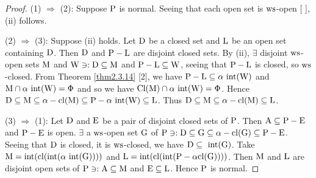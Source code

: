 \begin{proof}
(1) $\Rightarrow$ (2): Suppose $\mathrm{P}$ is normal. Seeing that each open set is $\mathrm{ws}$-open [ ], (ii) follows.

(2) $\Rightarrow$ (3): Suppose (ii) holds. Let $\mathrm{D}$ be a closed set and $\mathrm{L}$ be an open set containing $\mathrm{D}$. Then $\mathrm{D}$ and $\mathrm{P} -\mathrm{L}$ are disjoint closed sets. By (ii), $\exists$  disjoint $\mathrm{ws}$-open sets $\mathrm{M}$ and $\mathrm{W} \ni: \mathrm{D}\subseteq \mathrm{M}$ and $\mathrm{P}-\mathrm{L} \subseteq \mathrm{W}$, seeing that $\mathrm{P} -\mathrm{L}$ is closed, so $\mathrm{ws}$-closed. From Theorem \ref{thm2.3.14} [2], we have $\mathrm{P} -\mathrm{L} \subseteq \alpha\text{ int} (\mathrm{W})$ and $\mathrm{M} \cap \alpha\text{ int} (\mathrm{W}) = \Phi$ and so we have $\mathrm{Cl} (\mathrm{M}) \cap \alpha\text{ int} (\mathrm{W}) = \Phi$. Hence $\mathrm{D} \subseteq \mathrm{M} \subseteq \alpha-\mathrm{cl}(\mathrm{M}) \subseteq \mathrm{P} -\alpha\text{ int}(\mathrm{W}) \subseteq \mathrm{L}$. Thus $\mathrm{D}\subseteq\mathrm{M} \subseteq \alpha-\mathrm{cl} (\mathrm{M}) \subseteq \mathrm{L}$.

(3) $\Rightarrow$ (1): Let $\mathrm{D}$ and $\mathrm{E}$ be a pair of disjoint closed sets of $\mathrm{P}$. Then $\mathrm{A} \subseteq \mathrm{P}-\mathrm{E}$ and $\mathrm{P}-\mathrm{E}$ is open. $\exists$ a $\mathrm{ws}$-open set $\mathrm{G}$ of $\mathrm{P} \ni: \mathrm{D} \subseteq \mathrm{G} \subseteq \alpha-\mathrm{cl} (\mathrm{G}) \subseteq \mathrm{P}-\mathrm{E}$. Seeing that $\mathrm{D}$ is closed, it is $\mathrm{ws}$-closed, we have $\mathrm{D} \subseteq \text{ int} (\mathrm{G})$. Take $\mathrm{M} =\text{int} (\mathrm{cl} (\text{int} (\alpha\text{ int} (\mathrm{G}))))$ and $\mathrm{L} = \text{int} (\mathrm{cl} (\text{int}(\mathrm{P}-\alpha\mathrm{cl} (\mathrm{G}))))$. Then $\mathrm{M}$ and $\mathrm{L}$ are disjoint open sets of $\mathrm{P} \ni: \mathrm{A} \subseteq \mathrm{M}$ and $\mathrm{E} \subseteq \mathrm{L}$. Hence $\mathrm{P}$ is normal.
\end{proof}

